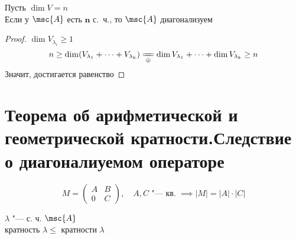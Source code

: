 \begin{implication}
	Пусть $ \dim V = n $ \\
	Если у $ \msc{A} $ есть $ \bm n $  с.~ч., то $ \msc{A} $ диагонализуем
\end{implication}

\begin{proof}
	$ \dim V_{\lambda_i} \ge 1 $
	$$ n \ge \dim(V_{\lambda_1} + \dots + V_{\lambda_k}) \undereq{\oplus} \dim V_{\lambda_1} + \dots + \dim V_{\lambda_k} \ge n $$
	Значит, достигается равенство
\end{proof}

\section{Теорема об арифметической и геометрической кратности.\n Следствие о диагоналиуемом операторе}

\begin{remind}
	$$ M =
	\begin{pmatrix}
		A & B \\
		0 & C
	\end{pmatrix}, \quad A, C \text{ "--- кв. } \implies |M| = |A| \cdot |C| $$
\end{remind}

\begin{theorem}
	$ \lambda $ "--- с. ч. $ \msc{A} $ \\
	 кратность $ \lambda \bm\le $  кратности $ \lambda $
\end{theorem}

